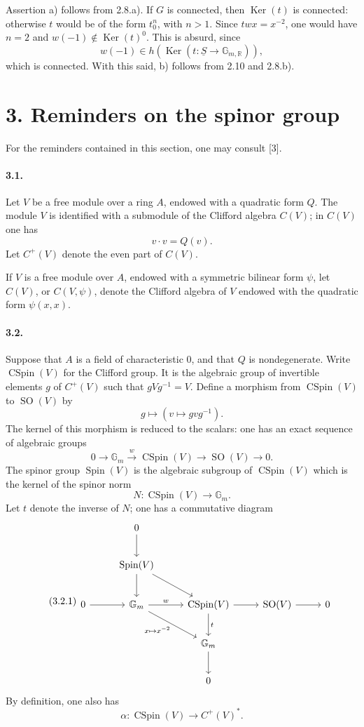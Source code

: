 \documentclass[10pt]{article}
\newcommand{\R}{\mathbb{R}}
\newcommand{\Gm}{\mathbb{G}_m}
\newcommand{\SO}{\operatorname{SO}}
\newcommand{\Spin}{\operatorname{Spin}}
\newcommand{\CSpin}{\operatorname{CSpin}}
\newcommand{\Ker}{\operatorname{Ker}}
\begin{document}
Assertion a) follows from 2.8.a). If $G$ is connected, then $\Ker(t)$ is connected: otherwise $t$ would be of the form $t_0^n$, with $n>1$. Since $twx=x^{-2}$, one would have $n=2$ and $w(-1)\notin\Ker(t)^0$. This is absurd, since
\[
w(-1)\in h(\Ker(t:\underline S\to\mathbb G_{m,\R})),
\]
which is connected. With this said, b) follows from 2.10 and 2.8.b).

\section*{3. Reminders on the spinor group}

For the reminders contained in this section, one may consult [3].

\paragraph{3.1.} Let $V$ be a free module over a ring $A$, endowed with a quadratic form $Q$. The module $V$ is identified with a submodule of the Clifford algebra $C(V)$; in $C(V)$ one has
\[
v\cdot v=Q(v).
\]
Let $C^+(V)$ denote the even part of $C(V)$.

If $V$ is a free module over $A$, endowed with a symmetric bilinear form $\psi$, let $C(V)$, or $C(V,\psi)$, denote the Clifford algebra of $V$ endowed with the quadratic form $\psi(x,x)$.

\paragraph{3.2.} Suppose that $A$ is a field of characteristic $0$, and that $Q$ is nondegenerate. Write $\CSpin(V)$ for the Clifford group. It is the algebraic group of invertible elements $g$ of $C^+(V)$ such that $gVg^{-1}=V$. Define a morphism from $\CSpin(V)$ to $\SO(V)$ by
\[
g\longmapsto (v\mapsto gvg^{-1}).
\]
The kernel of this morphism is reduced to the scalars: one has an exact sequence of algebraic groups
\[
0\longrightarrow\Gm\xrightarrow{\ w\ }\CSpin(V)\longrightarrow\SO(V)\longrightarrow0.
\]
The spinor group $\Spin(V)$ is the algebraic subgroup of $\CSpin(V)$ which is the kernel of the spinor norm
\[
N:\CSpin(V)\longrightarrow\Gm.
\]
Let $t$ denote the inverse of $N$; one has a commutative diagram
\[
\tag{3.2.1}
\begin{tikzcd}[column sep=2.6em,row sep=2.3em]
& 0 \arrow[d] & \\
& \Spin(V) \arrow[d] \arrow[dr] & \\
0 \arrow[r] & \Gm \arrow[r,"w"] \arrow[dr,"x\mapsto x^{-2}"'] & \CSpin(V) \arrow[r] \arrow[d,"t"] & \SO(V) \arrow[r] & 0\\
& & \Gm \arrow[d] & \\
& & 0 &
\end{tikzcd}
\]
By definition, one also has
\[
\tag{3.2.2}
\alpha:\CSpin(V)\longrightarrow C^+(V)^*.
\]
\end{document}
